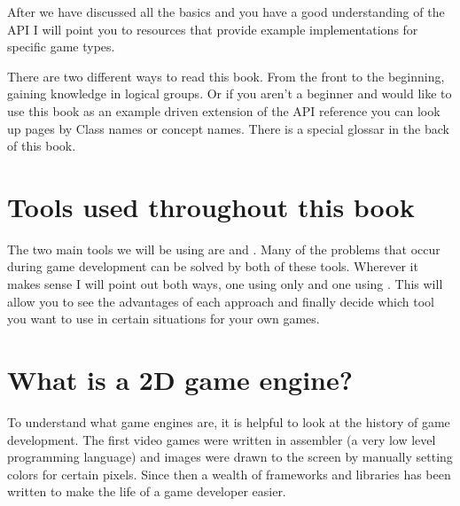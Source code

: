 After we have discussed all the basics and you have a good understanding of the
\cocos{} API I will point you to resources that provide example implementations
for specific game types.

There are two different ways to read this book. From the front to the beginning,
gaining knowledge in logical groups. Or if you aren't a beginner and would like
to use this book as an example driven extension of the API reference you can
look up pages by Class names or concept names. There is a special glossar in the
back of this book.

\section{Tools used throughout this book}
The two main tools we will be using are \cocos{} and \spriteb{}. Many of the
problems that occur during game development can be solved by both of these
tools. Wherever it makes sense I will point out both ways, one using only
\cocos{} and one using \spriteb{}. This will allow you to see the advantages of each approach
and finally decide which tool you want to use in certain situations for your own
games.

\section{What is a 2D game engine?}
To understand what game engines are, it is helpful to look at the history of
game development. The first video games were written in assembler (a very low level
programming language) and images were drawn to the screen by manually setting
colors for certain pixels. Since then a wealth of frameworks and libraries has been written to make the life of a game
developer easier. 
